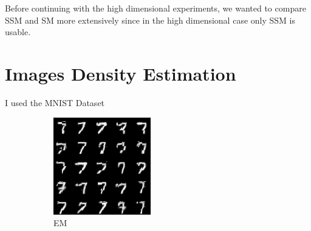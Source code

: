 Before continuing with the high dimensional experiments, we wanted to compare SSM and SM more extensively since in the high dimensional case
only SSM is usable. 

\newpage
\section{Images Density Estimation}

I used the MNIST Dataset \cite{mnist} 

\begin{figure}[H]
    \centering
    \begin{subfigure}[b]{0.3\textwidth}
        \centering
        \includegraphics[width=\textwidth]{figures/mnist_EM.png} %
        \caption{EM}
        \label{fig:sub1}
    \end{subfigure}
    \hfill
    \begin{subfigure}[b]{0.3\textwidth}
        \centering

\end{subfigure}
\end{figure}
